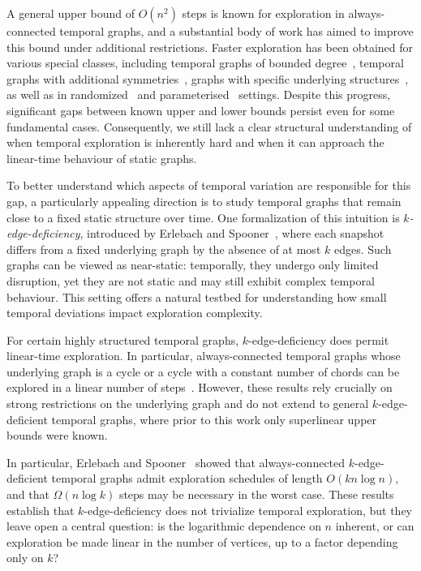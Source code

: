 \documentclass[a4paper,11pt]{article}
\theoremstyle{definition}
\theoremstyle{remark}
\begin{document}
    A general upper bound of $O(n^2)$ steps is known for exploration in always-connected temporal graphs, and a substantial body of work has aimed to improve this bound under additional restrictions. 
%    
    Faster exploration has been obtained for various special classes, including temporal graphs of bounded degree~\cite{ES18,EKLSS19,BGMR25}, temporal graphs with additional symmetries~\cite{DEKMM24}, graphs with specific underlying structures~\cite{IKW14,EHK21,Tag20,AGMZ22}, as well as in randomized~\cite{EHK21,BGKSSZ26} and parameterised~\cite{ES23,AFGW23} settings. Despite this progress, significant gaps between known upper and lower bounds persist even for some fundamental cases. Consequently, we still lack a clear structural understanding of when temporal exploration is inherently hard and when it can approach the linear-time behaviour of static graphs.

	To better understand which aspects of temporal variation are responsible for this gap, a particularly appealing direction is to study temporal graphs that remain close to a fixed static structure over time. 
    One formalization of this intuition is \emph{$k$-edge-deficiency}, introduced by Erlebach and Spooner~\cite{ES22}, where each snapshot differs from a fixed underlying graph by the absence of at most $k$ edges. Such graphs can be viewed as near-static: temporally, they undergo only limited disruption, yet they are not static and may still exhibit complex temporal behaviour. This setting offers a natural testbed for understanding how small temporal deviations impact exploration complexity.

    For certain highly structured temporal graphs, $k$-edge-deficiency does permit linear-time exploration. In particular, always-connected temporal graphs whose underlying graph is a cycle or a cycle with a constant number of chords can be explored in a linear number of steps~\cite{EHK21,Tag20,AGMZ22}. However, these results rely crucially on strong restrictions on the underlying graph and do not extend to general $k$-edge-deficient temporal graphs, where prior to this work only superlinear upper bounds were known.
	
	In particular, Erlebach and Spooner~\cite{ES22} showed that always-connected $k$-edge-deficient temporal graphs admit exploration schedules of length $O(kn \log n)$, and that $\Omega(n \log k)$ steps may be necessary in the worst case. These results establish that $k$-edge-deficiency does not trivialize temporal exploration, but they leave open a central question: is the logarithmic dependence on $n$ inherent, or can exploration be made linear in the number of vertices, up to a factor depending only on $k$? 
	
\end{document}
